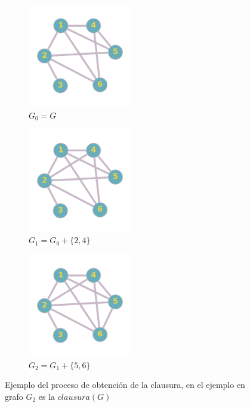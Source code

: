 \documentclass[a4paper,1pt]{report}
\begin{document}
\begin{figure}[H]
    \centering
    \begin{subfigure}[b]{0.3\textwidth}
    \centering
    \includegraphics[width=0.5\textwidth]{figures4/G0.png}
    \caption{$G_0 = G$}
    \end{subfigure}
    \begin{subfigure}[b]{0.3\textwidth}
        \centering
    \includegraphics[width=0.5\textwidth]{figures4/G1.png}
    \caption{$G_1 = G_0 + \{2,4\}$}
    \end{subfigure}
    \begin{subfigure}[b]{0.3\textwidth}
        \centering
    \includegraphics[width=0.5\textwidth]{figures4/G2.png}
    \caption{$G_2 = G_1 + \{5,6\}$}
    \end{subfigure}
    \caption{Ejemplo del proceso de obtenci\'on de la clausura, en el ejemplo en grafo $G_2$ es la $clausura(G)$}
\end{figure} 
\end{document}
